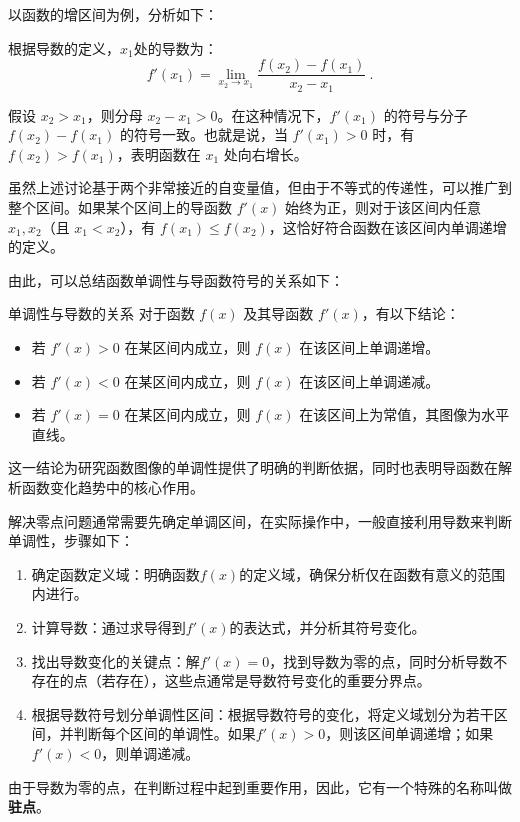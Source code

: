 以函数的增区间为例，分析如下：

根据导数的定义，$x_1$处的导数为：
\begin{equation}
f'(x_1) = \lim_{x_2 \to x_1} \frac{f(x_2) - f(x_1)}{x_2 - x_1}~.
\end{equation}

假设 $x_2 > x_1$，则分母 $x_2 - x_1 > 0$。在这种情况下，$f'(x_1)$ 的符号与分子 $f(x_2) - f(x_1)$ 的符号一致。也就是说，当 $f'(x_1) > 0$ 时，有 $f(x_2) > f(x_1)$，表明函数在 $x_1$ 处向右增长。

虽然上述讨论基于两个非常接近的自变量值，但由于不等式的传递性，可以推广到整个区间。如果某个区间上的导函数 $f'(x)$ 始终为正，则对于该区间内任意 $x_1, x_2$（且 $x_1 < x_2$），有 $f(x_1) \leq f(x_2)$，这恰好符合函数在该区间内单调递增的定义。

由此，可以总结函数单调性与导函数符号的关系如下：

\begin{theorem}{单调性与导数的关系}
对于函数 $f(x)$ 及其导函数 $f'(x)$，有以下结论：
\begin{itemize}
\item 若 $f'(x) > 0$ 在某区间内成立，则 $f(x)$ 在该区间上单调递增。
\item 若 $f'(x) < 0$ 在某区间内成立，则 $f(x)$ 在该区间上单调递减。
\item 若 $f'(x) = 0$ 在某区间内成立，则 $f(x)$ 在该区间上为常值，其图像为水平直线。
\end{itemize}
\end{theorem}

这一结论为研究函数图像的单调性提供了明确的判断依据，同时也表明导函数在解析函数变化趋势中的核心作用。

解决零点问题通常需要先确定单调区间，在实际操作中，一般直接利用导数来判断单调性，步骤如下：
\begin{enumerate}
\item 确定函数定义域：明确函数$f(x)$的定义域，确保分析仅在函数有意义的范围内进行。
\item 计算导数：通过求导得到$f'(x)$的表达式，并分析其符号变化。
\item 找出导数变化的关键点：解$f'(x) = 0$，找到导数为零的点，同时分析导数不存在的点（若存在），这些点通常是导数符号变化的重要分界点。
\item 根据导数符号划分单调性区间：根据导数符号的变化，将定义域划分为若干区间，并判断每个区间的单调性。如果$f'(x) > 0$，则该区间单调递增；如果$f'(x) < 0$，则单调递减。
\end{enumerate}

由于导数为零的点，在判断过程中起到重要作用，因此，它有一个特殊的名称叫做\textbf{驻点}。

